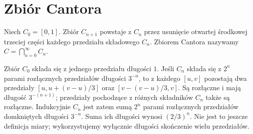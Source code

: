 \section{Zbiór Cantora}
\begin{definicja}
\label{ma1:def:cantor-set}
Niech $C_0=[0,1]$. Zbiór $C_{n+1}$ powstaje z $C_n$ przez usunięcie otwartej środkowej trzeciej części każdego przedziału składowego $C_n$. Zbiorem Cantora nazywamy $C=\bigcap_{n=0}^\infty C_n$.
\end{definicja}
Zbiór $C_0$ składa się z jednego przedziału długości $1$. Jeśli $C_n$ składa się z $2^n$ parami rozłącznych przedziałów długości $3^{-n}$, to z każdego $[u,v]$ pozostają dwa przedziały $[u,u+(v-u)/3]$ oraz $[v-(v-u)/3,v]$. Są rozłączne i mają długość $3^{-(n+1)}$; przedziały pochodzące z różnych składników $C_n$ także są rozłączne. Indukcyjnie $C_n$ jest zatem sumą $2^n$ parami rozłącznych przedziałów domkniętych długości $3^{-n}$. Suma ich długości wynosi $(2/3)^n$. Nie jest to jeszcze definicja miary; wykorzystujemy wyłącznie długości skończenie wielu przedziałów.

